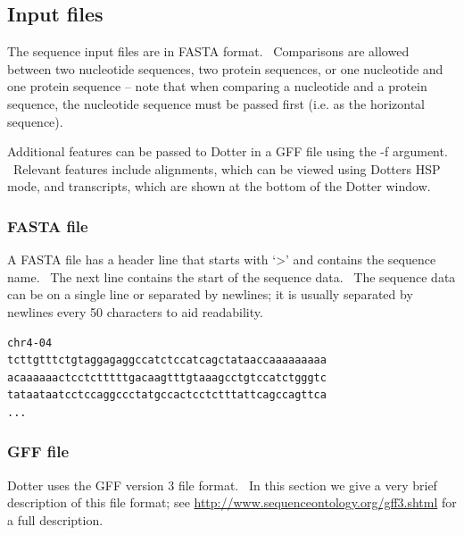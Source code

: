 \documentclass{report}
\begin{document}
\bigskip

{\color[rgb]{0.30980393,0.5058824,0.7411765}\subsection[Input files]{Input files}}
{The sequence input files are in FASTA format. \ Comparisons are allowed
between two nucleotide sequences, two protein sequences, or one
nucleotide and one protein sequence -- note that when comparing a
nucleotide and a protein sequence, the nucleotide sequence must be
passed first (i.e. as the horizontal sequence).}

\bigskip

{Additional features can be passed to Dotter in a GFF file using the {}-f
argument. \ Relevant features include alignments, which can be viewed
using Dotter{\textquotesingle}s HSP mode, and transcripts, which are
shown at the bottom of the Dotter window.}

\bigskip

{\color[rgb]{0.30980393,0.5058824,0.7411765}\subsubsection[FASTA file]{FASTA file}}
{A FASTA file has a header line that starts with
{\textquoteleft}{\textgreater}{\textquoteright} and contains the
sequence name. \ The next line contains the start of the sequence data.
\ The sequence data can be on a single line or separated by newlines;
it is usually separated by newlines every 50 characters to aid
readability.}

\begin{verbatim}
chr4-04
tcttgtttctgtaggagaggccatctccatcagctataaccaaaaaaaaa
acaaaaaactcctctttttgacaagtttgtaaagcctgtccatctgggtc
tataataatcctccaggccctatgccactcctctttattcagccagttca
...
\end{verbatim}

{\color[rgb]{0.30980393,0.5058824,0.7411765}\subsubsection[GFF file]{GFF file}}
{Dotter uses the GFF version 3 file format. \ In this section we give a
very brief description of this file format; see
\url{http://www.sequenceontology.org/gff3.shtml} for a full
description.}

\bigskip
\end{document}

